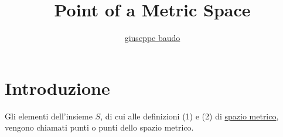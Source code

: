 \documentclass[a4paper,10pt]{article}
\title{Point of a Metric Space}
\author{\href{http://www.baudo.hol.es}{giuseppe baudo}}
\begin{document}
\maketitle

\section{Introduzione}
Gli elementi dell'insieme $S$, di cui alle definizioni (1) e (2) di \href{MetricSpace.html}{spazio metrico}, vengono chiamati punti o punti dello spazio metrico. 
\end{document}
